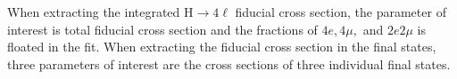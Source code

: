 When extracting the integrated H$\rightarrow4\ell$ fiducial cross section, the parameter of interest is  total fiducial cross section and the fractions of $4e,4\mu,$ and $2e2\mu$ is floated in the fit. When extracting the fiducial cross section in the final states, three parameters of interest are the cross sections of three individual final states.

